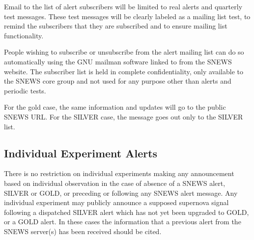 \documentclass{article}
\begin{document}
Email to the list of alert subscribers will be limited to real alerts
and quarterly test messages.  These test messages will be clearly
labeled as a mailing list test, to remind the subscribers that they are
subscribed and to ensure mailing list functionality.

People wishing to subscribe or unsubscribe from the alert mailing list
can do so automatically using the GNU mailman software linked to from
the SNEWS website.  The subscriber list is held in complete
confidentiality, only available to the SNEWS core group and not used for
any purpose other than alerts and periodic tests.


For the gold case, the same information and updates will go
to the public SNEWS URL.
For the SILVER case, the message goes out only to the SILVER list.

\subsection{Individual Experiment Alerts}

There is no restriction on individual experiments making any
announcement based on individual observation in the case of absence of
a SNEWS alert, SILVER or GOLD, or preceding or following any SNEWS
alert message.  Any individual experiment may publicly announce a
supposed supernova signal following a dispatched SILVER alert which
has not yet been upgraded to GOLD, or a GOLD alert.  In these cases
the information that a previous alert from the SNEWS server(s) has
been received should be cited.

                                         
\end{document}
